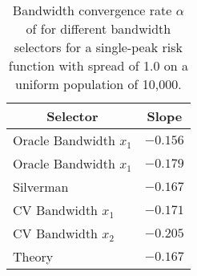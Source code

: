 \begin{table}[htbp]
\begin{center}
\begin{tabular}{lr}
\toprule
\multicolumn{1}{c}{Selector}&\multicolumn{1}{c}{Slope}\tabularnewline
\midrule
Oracle Bandwidth $x_1$&$-0.156$\tabularnewline
Oracle Bandwidth $x_1$&$-0.179$\tabularnewline
Silverman&$-0.167$\tabularnewline
CV Bandwidth $x_1$&$-0.171$\tabularnewline
CV Bandwidth $x_2$&$-0.205$\tabularnewline
Theory&$-0.167$\tabularnewline
\bottomrule
\end{tabular}
\caption[Bandwidth convergence rate of bandwidth selectors]{Bandwidth convergence rate $\alpha$ of for different bandwidth selectors for a single-peak risk function with spread of 1.0 on a uniform population of 10,000.\label{tab:results:bandwidth_alpha_by_selector}}\end{center}
\end{table}
